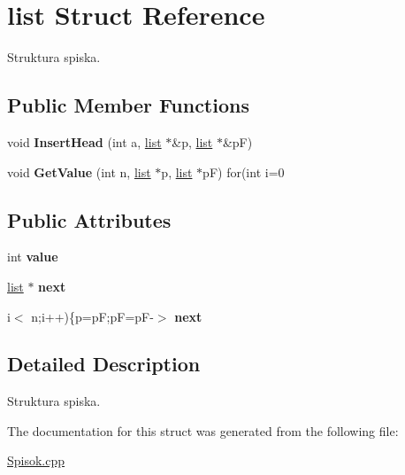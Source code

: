 \hypertarget{structlist}{\section{list Struct Reference}
\label{structlist}
}


Struktura spiska.  


\subsection*{Public Member Functions}
\begin{DoxyCompactItemize}
\item 
\hypertarget{structlist_ad3bd2c0e9d1a5adc232e5b789ca7110d}{void {\bfseries Insert\-Head} (int a, \hyperlink{structlist}{list} $\ast$\&p, \hyperlink{structlist}{list} $\ast$\&p\-F)}\label{structlist_ad3bd2c0e9d1a5adc232e5b789ca7110d}

\item 
\hypertarget{structlist_ae9db12dfc07e10e4a599bc97e450b755}{void {\bfseries Get\-Value} (int n, \hyperlink{structlist}{list} $\ast$p, \hyperlink{structlist}{list} $\ast$p\-F) for(int i=0}\label{structlist_ae9db12dfc07e10e4a599bc97e450b755}

\end{DoxyCompactItemize}
\subsection*{Public Attributes}
\begin{DoxyCompactItemize}
\item 
\hypertarget{structlist_a4fad30956372d1c56dd60d113d32ed8a}{int {\bfseries value}}\label{structlist_a4fad30956372d1c56dd60d113d32ed8a}

\item 
\hypertarget{structlist_ab9f6ff93b6de853d16cc36cfc77c197e}{\hyperlink{structlist}{list} $\ast$ {\bfseries next}}\label{structlist_ab9f6ff93b6de853d16cc36cfc77c197e}

\item 
\hypertarget{structlist_a40a5d3a0a2204112ba9e96c0e25a393b}{i$<$ n;i++)\{p=p\-F;p\-F=p\-F-\/$>$ {\bfseries next}}\label{structlist_a40a5d3a0a2204112ba9e96c0e25a393b}

\end{DoxyCompactItemize}


\subsection{Detailed Description}
Struktura spiska. 

The documentation for this struct was generated from the following file\-:\begin{DoxyCompactItemize}
\item 
\hyperlink{_spisok_8cpp}{Spisok.\-cpp}\end{DoxyCompactItemize}
